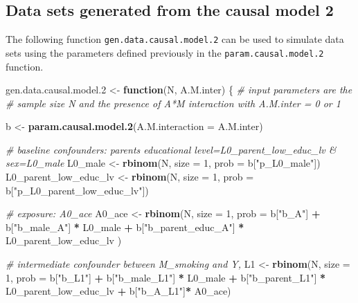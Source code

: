 \documentclass[
]{book}
\newenvironment{Shaded}{\begin{snugshade}}{\end{snugshade}}
\newcommand{\AttributeTok}[1]{\textcolor[rgb]{0.13,0.29,0.53}{#1}}
\newcommand{\CommentTok}[1]{\textcolor[rgb]{0.56,0.35,0.01}{\textit{#1}}}
\newcommand{\ControlFlowTok}[1]{\textcolor[rgb]{0.13,0.29,0.53}{\textbf{#1}}}
\newcommand{\DecValTok}[1]{\textcolor[rgb]{0.00,0.00,0.81}{#1}}
\newcommand{\FloatTok}[1]{\textcolor[rgb]{0.00,0.00,0.81}{#1}}
\newcommand{\FunctionTok}[1]{\textcolor[rgb]{0.13,0.29,0.53}{\textbf{#1}}}
\newcommand{\NormalTok}[1]{#1}
\newcommand{\OtherTok}[1]{\textcolor[rgb]{0.56,0.35,0.01}{#1}}
\newcommand{\SpecialCharTok}[1]{\textcolor[rgb]{0.81,0.36,0.00}{\textbf{#1}}}
\newcommand{\StringTok}[1]{\textcolor[rgb]{0.31,0.60,0.02}{#1}}
\begin{document}
\hypertarget{data-sets-generated-from-the-causal-model-2}{%
\subsection{Data sets generated from the causal model 2}\label{data-sets-generated-from-the-causal-model-2}}

The following function \texttt{gen.data.causal.model.2} can be used to simulate data sets using the parameters defined previously in the \texttt{param.causal.model.2} function.

\begin{Shaded}
\begin{Highlighting}[]
\NormalTok{gen.data.causal.model}\FloatTok{.2} \OtherTok{\textless{}{-}} \ControlFlowTok{function}\NormalTok{(N, A.M.inter) \{ }\CommentTok{\# input parameters are the }
  \CommentTok{\#   sample size N and the presence of A*M interaction with A.M.inter = 0 or 1}
  
\NormalTok{  b }\OtherTok{\textless{}{-}} \FunctionTok{param.causal.model.2}\NormalTok{(}\AttributeTok{A.M.interaction =}\NormalTok{ A.M.inter)}
    
  \CommentTok{\# baseline confounders: parent\textquotesingle{}s educational level=L0\_parent\_low\_educ\_lv \& sex=L0\_male}
\NormalTok{  L0\_male }\OtherTok{\textless{}{-}} \FunctionTok{rbinom}\NormalTok{(N, }\AttributeTok{size =} \DecValTok{1}\NormalTok{, }\AttributeTok{prob =}\NormalTok{ b[}\StringTok{"p\_L0\_male"}\NormalTok{]) }
\NormalTok{  L0\_parent\_low\_educ\_lv }\OtherTok{\textless{}{-}} \FunctionTok{rbinom}\NormalTok{(N, }\AttributeTok{size =} \DecValTok{1}\NormalTok{, }\AttributeTok{prob =}\NormalTok{ b[}\StringTok{"p\_L0\_parent\_low\_educ\_lv"}\NormalTok{])  }
  
  \CommentTok{\# exposure: A0\_ace}
\NormalTok{  A0\_ace }\OtherTok{\textless{}{-}} \FunctionTok{rbinom}\NormalTok{(N, }\AttributeTok{size =} \DecValTok{1}\NormalTok{, }\AttributeTok{prob =}\NormalTok{  b[}\StringTok{"b\_A"}\NormalTok{] }\SpecialCharTok{+} 
\NormalTok{                     b[}\StringTok{"b\_male\_A"}\NormalTok{] }\SpecialCharTok{*}\NormalTok{ L0\_male }\SpecialCharTok{+} 
\NormalTok{                     b[}\StringTok{"b\_parent\_educ\_A"}\NormalTok{] }\SpecialCharTok{*}\NormalTok{ L0\_parent\_low\_educ\_lv ) }
  
  \CommentTok{\# intermediate confounder between M\_smoking and Y, }
\NormalTok{  L1 }\OtherTok{\textless{}{-}} \FunctionTok{rbinom}\NormalTok{(N, }\AttributeTok{size =} \DecValTok{1}\NormalTok{, }\AttributeTok{prob =}\NormalTok{ b[}\StringTok{"b\_L1"}\NormalTok{] }\SpecialCharTok{+}
\NormalTok{                 b[}\StringTok{"b\_male\_L1"}\NormalTok{] }\SpecialCharTok{*}\NormalTok{ L0\_male }\SpecialCharTok{+}
\NormalTok{                 b[}\StringTok{"b\_parent\_L1"}\NormalTok{] }\SpecialCharTok{*}\NormalTok{ L0\_parent\_low\_educ\_lv }\SpecialCharTok{+} 
\NormalTok{                 b[}\StringTok{"b\_A\_L1"}\NormalTok{]}\SpecialCharTok{*}\NormalTok{ A0\_ace)}
  

\end{Highlighting}
\end{Shaded}
\end{document}
